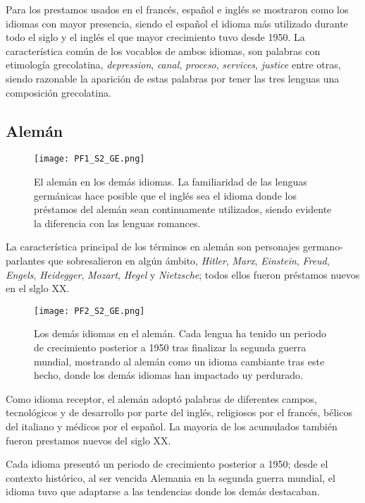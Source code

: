 Para los prestamos usados en el francés,  español e inglés se mostraron como los idiomas con mayor presencia, siendo el español el  idioma más utilizado durante todo el siglo y el inglés el que mayor crecimiento tuvo desde 1950. La característica común de los vocablos de ambos idiomas, son palabras con etimología grecolatina,  \textit{depression}, \textit{canal}, \textit{proceso}, \textit{services}, \textit{justice} entre otras,  siendo razonable la aparición de estas palabras por tener las tres lenguas una composición grecolatina. 



\subsection{Alemán} %

\begin{figure}%
	\centering
	\texttt{[image: PF1\_S2\_GE.png]}
	\label{fig.ST_a_GE}
	\caption{El alemán en los demás idiomas. La familiaridad de las lenguas germánicas hace posible que el inglés sea el idioma  donde los préstamos del alemán sean continuamente utilizados, siendo evidente la diferencia con las lenguas romances.}

\end{figure}

La característica principal de los términos en alemán son personajes germano-parlantes que sobresalieron en algún ámbito, \textit{Hitler}, \textit{Marx}, \textit{Einstein}, \textit{Freud}, \textit{Engels}, \textit{Heidegger}, \textit{Mozart}, \textit{Hegel} y \textit{Nietzsche}; todos ellos fueron préstamos nuevos en el slglo XX. 


\begin{figure}%
	\centering
	\texttt{[image: PF2\_S2\_GE.png]}
	\label{fig.ST_b_GE}
	\caption{Los demás idiomas en el alemán. Cada lengua ha tenido un periodo de  crecimiento posterior a 1950 tras finalizar la segunda guerra mundial, mostrando al alemán como un idioma cambiante tras este hecho, donde los demás idiomas han impactado uy perdurado.}
\end{figure}

Como idioma receptor, el alemán adoptó palabras de diferentes campos, tecnológicos y de desarrollo por parte del inglés,  religiosos  por el francés, bélicos del italiano y médicos por el español. La mayoria de los acumulados también fueron prestamos nuevos del siglo XX. 

Cada idioma presentó un periodo de crecimiento posterior a 1950; desde el contexto histórico, al ser vencida Alemania en la segunda guerra mundial, el idioma tuvo que adaptarse a las tendencias donde los demás destacaban. 



